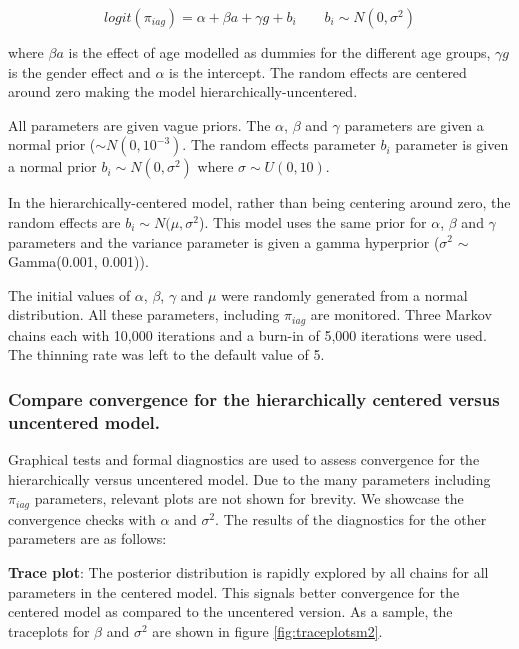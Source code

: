 \documentclass[12pt]{article}
\begin{document}
\[
    logit(\pi_{iag}) = \alpha + \beta a + \gamma g + b_i \qquad b_i \sim N(0, \sigma^2)
\]

\noindent where $\beta a$ is the effect of age modelled as dummies for the different age groups, $\gamma g$ is the gender effect and $\alpha$ is the intercept. The random effects are centered around zero making the model hierarchically-uncentered.

All parameters are given vague priors. The $\alpha$, $\beta$ and $\gamma$ parameters are given a normal prior ($\sim N(0, 10^{-3})$. The random effects parameter $b_i$ parameter is given a normal prior $b_i \sim N(0, \sigma^2)$ where $\sigma \sim U(0, 10)$.  %

In the hierarchically-centered model, rather than being centering around zero, the random effects are $b_i \sim N(\mu, \sigma^2$). This model uses the same prior for $\alpha$, $\beta$ and $\gamma$ parameters and the variance parameter is given a gamma hyperprior ($\sigma^2$ $\sim$ Gamma(0.001, 0.001)).

The initial values of $\alpha$, $\beta$, $\gamma$ and $\mu$ were randomly generated from a normal distribution. All these parameters, including $\pi_{iag}$ are monitored. Three Markov chains each with 10,000 iterations and a burn-in of 5,000 iterations were used. The thinning rate was left to the default value of 5. 


\subsubsection{ Compare convergence for the hierarchically centered versus uncentered model.}


Graphical tests and formal diagnostics are used to assess convergence for the hierarchically versus uncentered model.  Due to the many parameters including $\pi_{iag}$ parameters, relevant plots are not shown for brevity. We showcase the convergence checks with $\alpha$ and $\sigma^2$. The results of the diagnostics for the other parameters are as follows:

\textbf{Trace plot}: The posterior distribution is rapidly explored by all chains for all parameters in the centered model. This signals better convergence for the centered model as compared to the uncentered version.  As a sample, the traceplots for $\beta$ and $\sigma^2$ are shown in figure \ref{fig:traceplotsm2}.
\end{document}
